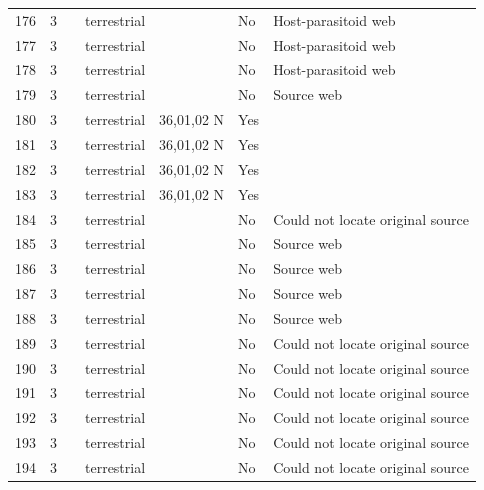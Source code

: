 \documentclass[12pt]{article}
\begin{document}
\begin{landscape}
\begin{table}[h!]
{\begin{tabular}{p{2.8cm}p{1.3cm}p{3cm}p{2.2cm}p{2.5cm}lp{8.2cm}}
        176   & 3 & \cite{Hawkins1984}    & terrestrial &       & No    & Host-parasitoid web \\
        177   & 3 & \cite{Hawkins1984}    & terrestrial &       & No    & Host-parasitoid web \\
        178   & 3 & \cite{Hawkins1984}    & terrestrial &       & No    & Host-parasitoid web \\
        179   & 3 & \cite{Robinson1953}  & terrestrial &       & No    & Source web \\
        180   & 3 & \cite{Savely1939}    & terrestrial & 36,01,02 N & Yes   &       \\
        181   & 3 & \cite{Savely1939}    & terrestrial & 36,01,02 N & Yes   &       \\
        182   & 3 & \cite{Savely1939}    & terrestrial & 36,01,02 N & Yes   &       \\
        183   & 3 & \cite{Savely1939}    & terrestrial & 36,01,02 N & Yes   &       \\
        184   & 3 & \cite{Beaver1972}     & terrestrial &       & No    & Could not locate original source \\
        185   & 3 & \cite{Chapman1955}     & terrestrial &       & No    & Source web \\
        186   & 3 & \cite{Cornaby1974}  & terrestrial &       & No    & Source web \\
        187   & 3 & \cite{Cornaby1974}  & terrestrial &       & No    & Source web \\
        188   & 3 & \cite{Jiron1981}  & terrestrial &       & No    & Source web \\
        189   & 3 & \cite{McKinnerney1978}    & terrestrial &       & No    & Could not locate original source \\
        190   & 3 & \cite{McKinnerney1978}    & terrestrial &       & No    & Could not locate original source \\
        191   & 3 & \cite{McKinnerney1978}    & terrestrial &       & No    & Could not locate original source \\
        192   & 3 & \cite{McKinnerney1978}    & terrestrial &       & No    & Could not locate original source \\
        193   & 3 & \cite{McKinnerney1978}    & terrestrial &       & No    & Could not locate original source \\
        194   & 3 & \cite{McKinnerney1978}    & terrestrial &       & No    & Could not locate original source \\
        \hline
        \end{tabular}}%
      \end{table}


\end{landscape}
\end{document}
